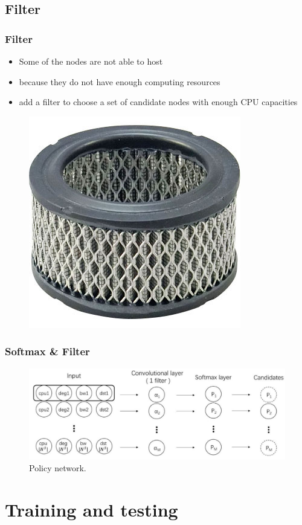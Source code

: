 \documentclass{beamer}
\begin{document}
\subsection{Filter}
\begin{frame}
	\frametitle{Filter}
	\begin{itemize}
		\item {Some of the nodes are not able to host}
		\item{because they do not have enough computing resources}
		\item{add a filter to choose a set of candidate nodes with enough CPU
			capacities}
	\end{itemize}
\begin{figure}
	\centering
	\includegraphics[width=0.3\linewidth]{../Images/filter}
	\label{fig:filter}
\end{figure}
\end{frame}
\begin{frame}
\frametitle{Softmax \& Filter}
\begin{figure}
	\centering
	\includegraphics[width=0.9\linewidth]{../Images/policyNetwork}
	\caption{Policy network.}
	\label{fig:policynetwork}
\end{figure}
\end{frame}

\section{Training and testing}
\end{document}
